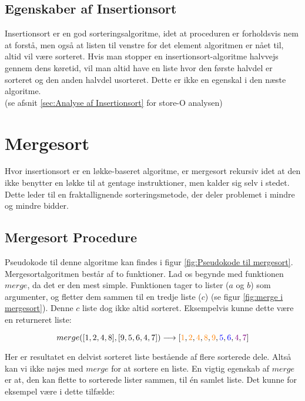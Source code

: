 \subsection{Egenskaber af Insertionsort}%
\label{sub:Egenskaber af Insertionsort}
Insertionsort er en god sorteringsalgoritme, idet at proceduren er forholdsvis nem at forstå, men også at listen til venstre for det element algoritmen er nået til, altid vil være sorteret. Hvis man stopper en insertionsort-algoritme halvvejs gennem dens køretid, vil man altid have en liste hvor den første halvdel er sorteret og den anden halvdel usorteret. Dette er ikke en egenskal i den næste algoritme.\\

(se afsnit \ref{sec:Analyse af Insertionsort} for store-O analysen)



\section{Mergesort}
\label{sec:Mergesort}

Hvor insertionsort er en løkke-baseret algoritme, er mergesort rekursiv idet at den ikke benytter en løkke til at gentage instruktioner, men kalder sig selv i stedet. Dette leder til en fraktallignende sorteringsmetode, der deler problemet i mindre og mindre bidder. 

\subsection{Mergesort Procedure}%
\label{sub:Mergesort Procedure}

Pseudokode til denne algoritme kan findes i figur \ref{fig:Pseudokode til mergesort}.\\

Mergesortalgoritmen består af to funktioner. Lad os begynde med funktionen $merge$, da det er den mest simple. Funktionen tager to lister ($a$ og $b$) som argumenter, og fletter dem sammen til en tredje liste ($c$) (se figur \ref{fig:merge i mergesort}). Denne $c$ liste dog ikke altid sorteret. Eksempelvis kunne dette være en returneret liste:

$$merge([1,2,4,8],[9,5,6,4,7]) \longrightarrow [\color{orange}1\color{black}, \color{orange}2\color{black}, \color{orange}4\color{black}, \color{orange}8\color{black}, \color{orange}9\color{black}, \color{blue}5\color{black}, \color{blue}6\color{black}, \color{violet}4\color{black}, \color{violet}7\color{black}]$$

Her er resultatet en delvist sorteret liste bestående af flere sorterede dele. Altså kan vi ikke nøjes med $merge$ for at sortere en liste. En vigtig egenskab af $merge$ er at, den kan flette to sorterede lister sammen, til én samlet liste. Det kunne for eksempel være i dette tilfælde:

